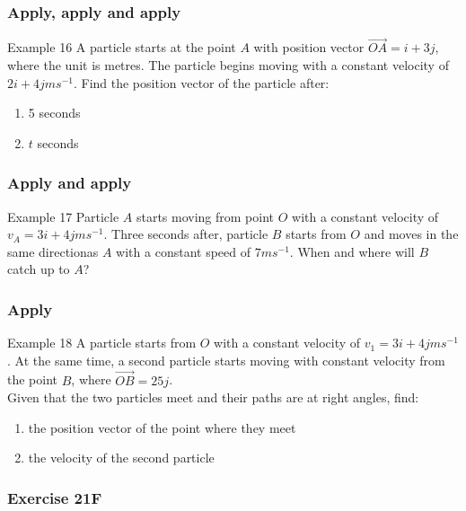 \documentclass[
	11pt, %
]{beamer}
\newcommand{\blank}{\begin{frame}\end{frame}}
\begin{document}
\begin{frame}[t]
    \frametitle{Apply, apply and apply}
    \begin{block}{Example 16}
        A particle starts at the point $A$ with position vector $\vec{OA} = i + 3j$, where the unit is metres. The particle begins moving 
        with a constant velocity of $2i + 4j ms^{-1}$. Find the position vector of the particle after:\\
        \begin{enumerate}
            \item 5 seconds
            \item $t$ seconds
        \end{enumerate}
    \end{block}
\end{frame}

\begin{frame}[t]
    \frametitle{Apply and apply}
    \begin{block}{Example 17}
        Particle $A$ starts moving from point $O$ with a constant velocity of $v_A = 3i+4j ms^{-1}$. Three seconds after, particle $B$ starts from 
        $O$ and moves in the same directionas $A$ with a constant speed of $7 ms^{-1}$. When and where will $B$ catch up to $A$?
    \end{block}
\end{frame}
\blank

\begin{frame}[t]
    \frametitle{Apply}
    \begin{block}{Example 18}
        A particle starts from $O$ with a constant velocity of $v_1 = 3i + 4j ms^{-1}$. At the same time, a second particle 
        starts moving with constant velocity from the point $B$, where $\vec{OB} = 25j$.\\
        Given that the two particles meet and their paths are at right angles, find:\\
        \begin{enumerate}
            \item the position vector of the point where they meet
            \item the velocity of the second particle
        \end{enumerate}
    \end{block}
\end{frame}
\blank

\begin{frame}
    \frametitle{Exercise 21F}
\end{frame}
\end{document}
